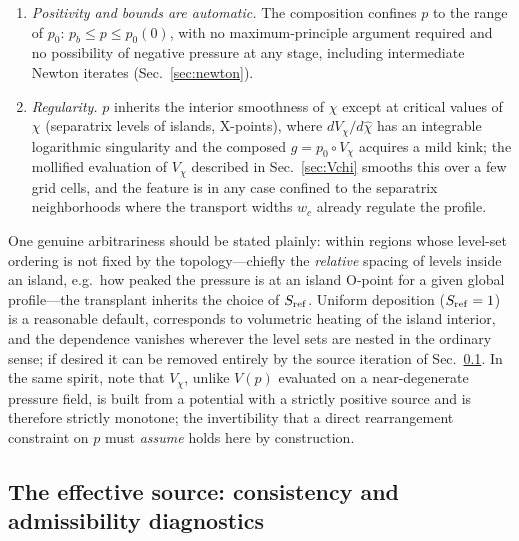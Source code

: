 \documentclass[english]{article}
\begin{document}
\begin{enumerate}
Sec.~\ref{sec:p_properties}, and $\chi(\psi)$ is strictly monotone: the flux-surface average of
(M4a) gives $-V'\langle\kappa_\perp|\nabla\psi|^{2}\rangle\,d\chi/d\psi=\int_0^{V(\psi)}
S_{\rm ref}\,dV>0$ [cf.~Eq.~(\ref{eq:1D_transport})]. Then $V_\chi(\chi(\psi))=V(\psi)$ and
$p=p_0(V(\psi))$: precisely the classical specification of pressure versus enclosed volume, with
isobars coinciding with flux surfaces to $O(\varepsilon_\kappa)$.
\item \emph{Positivity and bounds are automatic.} The composition confines $p$ to the range of
$p_0$: $p_b\le p\le p_0(0)$, with no maximum-principle argument required and no possibility of
negative pressure at any stage, including intermediate Newton iterates
(Sec.~\ref{sec:newton}).
\item \emph{Regularity.} $p$ inherits the interior smoothness of $\chi$ except at critical values
of $\chi$ (separatrix levels of islands, X-points), where $dV_\chi/d\hat\chi$ has an integrable
logarithmic singularity and the composed $g=p_0\circ V_\chi$ acquires a mild kink; the mollified
evaluation of $V_\chi$ described in Sec.~\ref{sec:Vchi} smooths this over a few grid cells, and the
feature is in any case confined to the separatrix neighborhoods where the transport widths
$w_c$ already regulate the profile.
\end{enumerate}

One genuine arbitrariness should be stated plainly: within regions whose level-set ordering is not
fixed by the topology---chiefly the \emph{relative} spacing of levels inside an island, e.g.\ how
peaked the pressure is at an island O-point for a given global profile---the transplant inherits
the choice of $S_{\rm ref}$. Uniform deposition ($S_{\rm ref}=1$) is a reasonable default,
corresponds to volumetric heating of the island interior, and the dependence vanishes wherever the
level sets are nested in the ordinary sense; if desired it can be removed entirely by the source
iteration of Sec.~\ref{sec:Seff}. In the same spirit, note that $V_\chi$, unlike $V(p)$ evaluated
on a near-degenerate pressure field, is built from a potential with a strictly positive source and
is therefore strictly monotone; the invertibility that a direct rearrangement constraint on $p$
must \emph{assume} holds here by construction.

\subsection{The effective source: consistency and admissibility diagnostics}
\label{sec:Seff}
\end{document}
